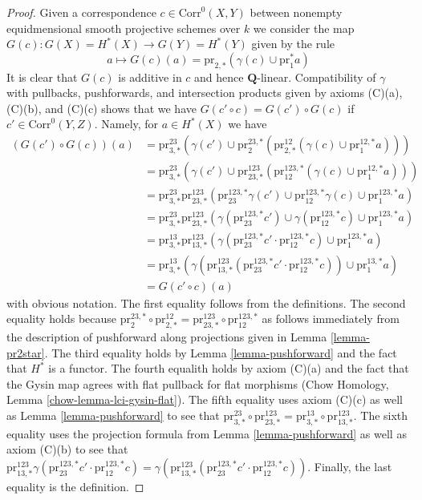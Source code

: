 \begin{proof}
\medskip\noindent
Given a correspondence $c \in \text{Corr}^0(X, Y)$ between
nonempty equidmensional smooth projective schemes over $k$
we consider the map $G(c) : G(X) = H^*(X) \to G(Y) = H^*(Y)$
given by the rule
$$
a \longmapsto
G(c)(a) = \text{pr}_{2, *}(\gamma(c) \cup \text{pr}_1^*a)
$$
It is clear that $G(c)$ is additive in $c$ and hence $\mathbf{Q}$-linear.
Compatibility of $\gamma$ with pullbacks, pushforwards, and
intersection products given by axioms (C)(a), (C)(b), and (C)(c)
shows that we have
$G(c' \circ c) = G(c') \circ G(c)$ if $c' \in \text{Corr}^0(Y, Z)$.
Namely, for $a \in H^*(X)$ we have
\begin{align*}
(G(c') \circ G(c))(a)
& =
\text{pr}^{23}_{3, *}(\gamma(c') \cup
\text{pr}^{23, *}_2(\text{pr}^{12}_{2, *}(\gamma(c) \cup
\text{pr}^{12, *}_1a))) \\
& =
\text{pr}^{23}_{3, *}(\gamma(c') \cup
\text{pr}^{123}_{23, *}(\text{pr}^{123, *}_{12}(\gamma(c) \cup
\text{pr}^{12, *}_1 a))) \\
& =
\text{pr}^{23}_{3, *}
\text{pr}^{123}_{23, *}(
\text{pr}^{123, *}_{23}\gamma(c') \cup
\text{pr}^{123, *}_{12}\gamma(c) \cup
\text{pr}^{123, *}_1 a) \\
& =
\text{pr}^{23}_{3, *}
\text{pr}^{123}_{23, *}(
\gamma(\text{pr}^{123, *}_{23}c') \cup
\gamma(\text{pr}^{123, *}_{12}c) \cup
\text{pr}^{123, *}_1 a) \\
& =
\text{pr}^{13}_{3, *}
\text{pr}^{123}_{13, *}(
\gamma(\text{pr}^{123, *}_{23}c' \cdot \text{pr}^{123, *}_{12}c) \cup
\text{pr}^{123, *}_1 a) \\
& =
\text{pr}^{13}_{3, *}(
\gamma(\text{pr}^{123}_{13, *}(\text{pr}^{123, *}_{23}c' \cdot
\text{pr}^{123, *}_{12}c)) \cup
\text{pr}^{13, *}_1 a) \\
& =
G(c' \circ c)(a)
\end{align*}
with obvious notation. The first equality follows from the definitions.
The second equality holds because
$\text{pr}^{23, *}_2 \circ \text{pr}^{12}_{2, *} =
\text{pr}^{123}_{23, *} \circ \text{pr}^{123, *}_{12}$
as follows immediately from the description of pushforward
along projections given in Lemma \ref{lemma-pr2star}.
The third equality holds by Lemma \ref{lemma-pushforward}
and the fact that $H^*$ is a functor.
The fourth equalith holds by axiom (C)(a) and the fact that
the Gysin map agrees with flat pullback for flat morphisms
(Chow Homology, Lemma \ref{chow-lemma-lci-gysin-flat}).
The fifth equality uses axiom (C)(c) as well as
Lemma \ref{lemma-pushforward} to see that
$\text{pr}^{23}_{3, *} \circ \text{pr}^{123}_{23, *} =
\text{pr}^{13}_{3, *} \circ \text{pr}^{123}_{13, *}$.
The sixth equality uses the projection formula from
Lemma \ref{lemma-pushforward} as well as
axiom (C)(b) to see that $
\text{pr}^{123}_{13, *}
\gamma(\text{pr}^{123, *}_{23}c' \cdot \text{pr}^{123, *}_{12}c) =
\gamma(\text{pr}^{123}_{13, *}(
\text{pr}^{123, *}_{23}c' \cdot \text{pr}^{123, *}_{12}c))$.
Finally, the last equality is the definition.


\end{proof}
